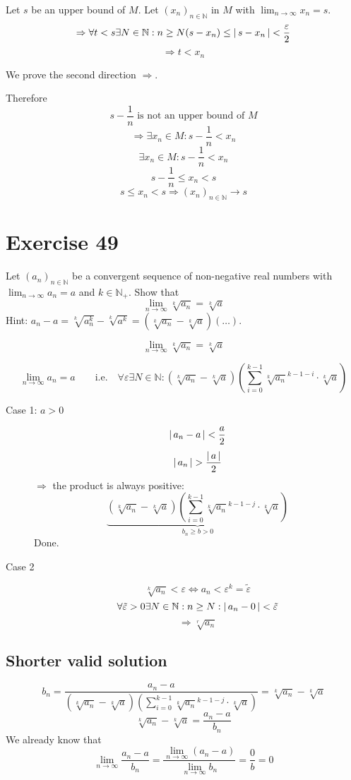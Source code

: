 \documentclass[a4paper]{article}
\theoremstyle{definition}
\newcommand\abs[1]{\left|\thinspace #1\thinspace\right|}
\begin{document}
Let $s$ be an upper bound of $M$.
Let $(x_n)_{n \in \mathbb N}$ in $M$ with $\lim_{n\to\infty} x_n = s$.
\[ \Rightarrow \forall t < s \exists N \in \mathbb N: n \geq N(s - x_n) \leq \abs{s-x_n} < \frac{\varepsilon}{2} \]
\[ \Rightarrow t < x_n \]

We prove the second direction $\Rightarrow$.

Therefore
\[ s - \frac1n \text{ is not an upper bound of } M \]
\[ \Rightarrow \exists x_n \in M: s - \frac1n < x_n \]
\[ \exists x_n \in M: s - \frac1n < x_n \]
\[ s - \frac1n \leq x_n < s \]
\[ s \leq x_n < s \Rightarrow (x_n)_{n\in\mathbb N} \to s \]


\section{Exercise 49}
\begin{ex}
  Let $(a_n)_{n\in\mathbb N}$ be a convergent sequence of non-negative real numbers
  with $\lim_{n\to\infty} a_n = a$ and $k \in \mathbb N_+$. Show that
  \[ \lim_{n\to\infty} \sqrt[k]{a_n} = \sqrt[k]{a} \]
  Hint: $a_n - a = \sqrt[k]{a_n^k} - \sqrt[k]{a^k} = (\sqrt[k]{a_n} - \sqrt[k]{a}) (\dots)$.
\end{ex}

\[ \lim_{n\to\infty} \sqrt[k]{a_n} = \sqrt[k]{a} \]

\[
    \lim_{n\to\infty} a_n = a \qquad \text{i.e.} \quad \forall \varepsilon \exists N \in \mathbb N:
    \left(\sqrt[k]{a_n} - \sqrt[k]{a}\right) \left(\sum_{i=0}^{k-1} \sqrt[k]{a_n}^{k-1-i} \cdot \sqrt[k]{a}\right)
\]

\begin{description}
  \item[Case 1: $a > 0$]
    \[ \abs{a_n - a} < \frac{a}{2} \]
    \[ \abs{a_n} > \frac{\abs{a}}{2} \]
    $\Rightarrow$ the product is always positive:
    \[ \underbrace{\left(\sqrt[k]{a_n} - \sqrt[k]{a}\right) \left(\sum_{i=0}^{k-1} \sqrt[k]{a_n}^{k-1-j} \cdot \sqrt[k]{a}\right)}_{b_n \geq b > 0} \]
    Done.
  \item[Case 2]
    \[ \sqrt[k]{a_n} < \varepsilon \Leftrightarrow a_n < \varepsilon^k = \tilde\varepsilon \]
    \[ \forall \tilde\varepsilon > 0 \exists N \in \mathbb N: n \geq N: \abs{a_n - 0} < \tilde\varepsilon \]
    \[ \Rightarrow \sqrt[r]{a_n} \]
\end{description}

\subsection{Shorter valid solution}
\[
  b_n
  = \frac{a_n - a}{\left(\sqrt[k]{a_n} - \sqrt[k]{a}\right) \left(\sum_{i=0}^{k-1} \sqrt[k]{a_n}^{k-1-j} \cdot \sqrt[k]{a}\right)}
  = \sqrt[k]{a_n} - \sqrt[k]{a}
\]
\[
  \sqrt[k]{a_n} - \sqrt[k]{a} = \frac{a_n - a}{b_n}
\]
We already know that
\[ \lim_{n\to\infty} \frac{a_n - a}{b_n} = \frac{\lim_{n\to\infty} (a_n - a)}{\lim_{n\to\infty} b_n} = \frac0b = 0 \]
\end{document}

